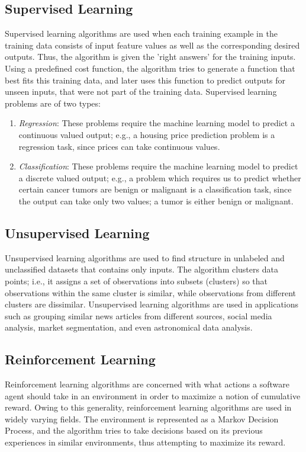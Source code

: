 \documentclass[a4paper, 12pt]{article}
\begin{document}
\subsection{Supervised Learning}
Supervised learning algorithms are used when each training example in the training data consists of input feature values as well as the corresponding desired outputs. Thus, the algorithm is given the 'right answers' for the training inputs. Using a predefined cost function, the algorithm tries to generate a function that best fits this training data, and later uses this function to predict outputs for unseen inputs, that were not part of the training data. Supervised learning problems are of two types:
\begin{enumerate}
\item \textit{Regression}: These problems require the machine learning model to predict a continuous valued output; e.g., a housing price prediction problem is a regression task, since prices can take continuous values.
\item \textit{Classification}: These problems require the machine learning model to predict a discrete valued output; e.g., a problem which requires us to predict whether certain cancer tumors are benign or malignant is a classification task, since the output can take only two values; a tumor is either benign or malignant.
\end{enumerate}

\subsection{Unsupervised Learning}
Unsupervised learning algorithms are used to find structure in unlabeled and unclassified datasets that contains only inputs. The algorithm clusters data points; i.e., it assigns a set of observations into subsets (clusters) so that observations within the same cluster is similar, while observations from different clusters are dissimilar. Unsupervised learning algorithms are used in applications such as grouping similar news articles from different sources, social media analysis, market segmentation, and even astronomical data analysis.

\subsection{Reinforcement Learning}
Reinforcement learning algorithms are concerned with what actions a software agent should take in an environment in order to maximize a notion of cumulative reward. Owing to this generality, reinforcement learning algorithms are used in widely varying fields. The environment is represented as a Markov Decision Process, and the algorithm tries to take decisions based on its previous experiences in similar environments, thus attempting to maximize its reward.
\end{document}
